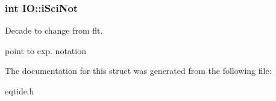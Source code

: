 \subsubsection[{i\+Sci\+Not}]{\setlength{\rightskip}{0pt plus 5cm}int I\+O\+::i\+Sci\+Not}\label{struct_i_o_a703b6e2abf0338ef9723604bc88af810}


Decade to change from flt. 

point to exp. notation 

The documentation for this struct was generated from the following file\+:\begin{DoxyCompactItemize}
\item 
eqtide.\+h\end{DoxyCompactItemize}
